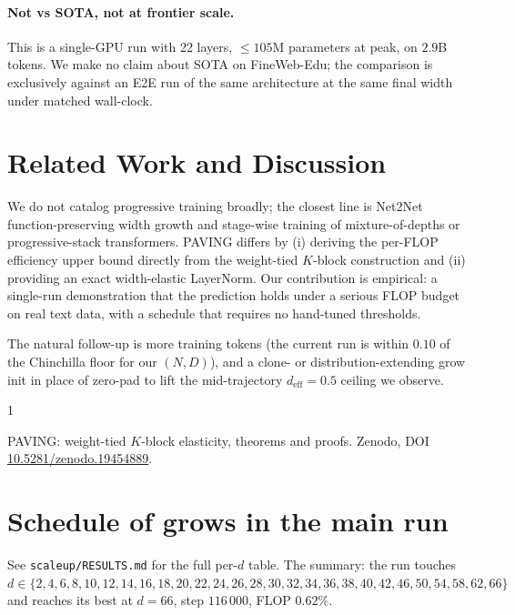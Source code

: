 \documentclass{article}
\begin{document}
\paragraph{Not vs SOTA, not at frontier scale.}
This is a single-GPU run with 22 layers, $\le 105$M parameters at
peak, on $2.9$B tokens.  We make no claim about SOTA on FineWeb-Edu;
the comparison is exclusively against an E2E run of the same
architecture at the same final width under matched wall-clock.

\section{Related Work and Discussion}

We do not catalog progressive training broadly; the closest line is Net2Net
function-preserving width growth and stage-wise training of mixture-of-depths
or progressive-stack transformers.  PAVING differs by (i) deriving the
per-FLOP efficiency upper bound directly from the weight-tied $K$-block
construction and (ii) providing an exact width-elastic LayerNorm.  Our
contribution is empirical: a single-run demonstration that the prediction
holds under a serious FLOP budget on real text data, with a schedule that
requires no hand-tuned thresholds.

The natural follow-up is more training tokens (the current run is
within $0.10$ of the Chinchilla floor for our $(N, D)$), and a clone-
or distribution-extending grow init in place of zero-pad to lift the
mid-trajectory $d_{\text{eff}}{=}0.5$ ceiling we observe.


\begin{thebibliography}{1}

 PAVING: weight-tied $K$-block elasticity, theorems and proofs.
Zenodo, DOI \href{https://doi.org/10.5281/zenodo.19454889}{10.5281/zenodo.19454889}.

\end{thebibliography}

\appendix

\section{Schedule of grows in the main run}
\label{app:trajectory}
See \texttt{scaleup/RESULTS.md} for the full per-$d$ table.  The summary:
the run touches $d \in \{2, 4, 6, 8, 10, 12, 14, 16, 18, 20, 22, 24, 26, 28,
30, 32, 34, 36, 38, 40, 42, 46, 50, 54, 58, 62, 66\}$ and reaches its best
at $d=66$, step $116\,000$, FLOP $0.62\%$.
\end{document}
